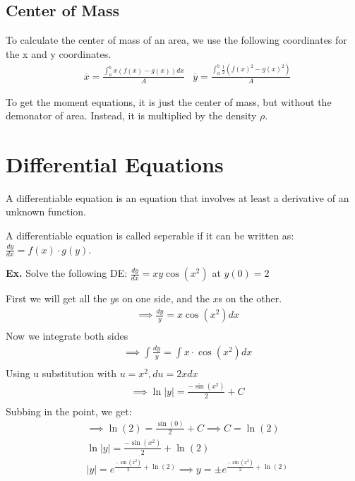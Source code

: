 \documentclass[12pt,letterpaper]{article} \usepackage{amsmath} \usepackage{graphicx}  \usepackage{longtable}  \usepackage{amssymb}
\begin{document}
        \subsection{Center of Mass}
        To calculate the center of mass of an area, we use the following coordinates for the x and y coordinates.
        \begin{align*}
            &\overline{x}=\frac{\int^b_a x(f(x)-g(x))dx}{A} & \overline{y}=\frac{\int^b_a \frac{1}{2}(f(x)^2 - g(x)^2)}{A}
        \end{align*}

        To get the moment equations, it is just the center of mass, but without the demonator of area. Instead, it is multiplied by the density $\rho$.

    \section{Differential Equations}
    A differentiable equation is an equation that involves at least a derivative of an unknown function. 
    
    A differentiable equation is called seperable if it can be written as: $\frac{dy}{dx} = f(x)\cdot g(y)$.

    \begin{mdframed}
        \textbf{Ex. } Solve the following DE: $\frac{dy}{dx} = xy\cos(x^2)$ at $y(0) = 2$

        First we will get all the $y$s on one side, and the $x$s on the other.
        \begin{align*}
            &\implies \frac{dy}{y} = x\cos(x^2)dx\\
        \end{align*}
        Now we integrate both sides
        \begin{align*}
            &\implies \int \frac{dy}{y} = \int x\cdot \cos(x^2) dx\\
        \end{align*}
        Using u substitution with $ u = x^2, du = 2xdx$
        \begin{align*}
            &\implies \ln|y| = \frac{-\sin(x^2)}{2}+C\\
        \end{align*}
        Subbing in the point, we get:
        \begin{align*}
            &\implies \ln(2)=\frac{\sin(0)}{2}+C \implies C=\ln(2)\\
            &\ln|y| = \frac{-\sin(x^2)}{2} + \ln(2)\\
            &|y| = e^{\frac{-\sin(x^2)}{2}+\ln(2)} \implies y = \pm e^{\frac{-\sin(x^2)}{2}+\ln(2)}
        \end{align*}
    \end{mdframed}
\end{document}
